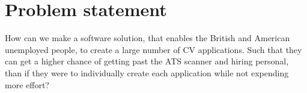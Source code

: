 \section{Problem statement}\label{sec:problem}
How can we make a software solution, that enables the British and American unemployed people, 
to create a large number of CV applications.
Such that they can get a higher chance of getting past the ATS scanner and hiring personal, than
if they were to individually create each application while not expending more effort? 